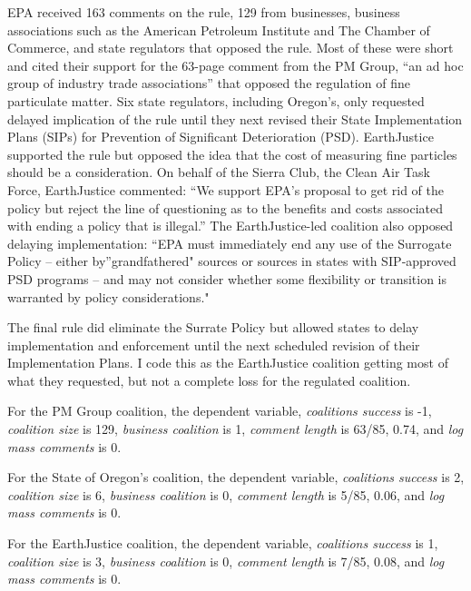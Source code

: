 \documentclass[
      12pt,
        ]{article}
\begin{document}
EPA received 163 comments on the rule, 129 from businesses, business associations such as the American Petroleum Institute and The Chamber of Commerce, and state regulators that opposed the rule. Most of these were short and cited their support for the 63-page comment from the PM Group, ``an ad hoc group of industry trade associations'' that opposed the regulation of fine particulate matter. Six state regulators, including Oregon's, only requested delayed implication of the rule until they next revised their State Implementation Plans (SIPs) for Prevention of Significant Deterioration (PSD). EarthJustice supported the rule but opposed the idea that the cost of measuring fine particles should be a consideration. On behalf of the Sierra Club, the Clean Air Task Force, EarthJustice commented: ``We support EPA's proposal to get rid of the policy but reject the line of questioning as to the benefits and costs associated with ending a policy that is illegal.'' The EarthJustice-led coalition also opposed delaying implementation: ``EPA must immediately end any use of the Surrogate Policy -- either by''grandfathered" sources or sources in states with SIP‐approved PSD programs -- and may not consider whether some flexibility or transition is warranted by policy considerations."

The final rule did eliminate the Surrate Policy but allowed states to delay implementation and enforcement until the next scheduled revision of their Implementation Plans. I code this as the EarthJustice coalition getting most of what they requested, but not a complete loss for the regulated coalition.

For the PM Group coalition, the dependent variable, \emph{coalitions success} is -1, \emph{coalition size} is 129, \emph{business coalition} is 1, \emph{comment length} is 63/85, 0.74, and \emph{log mass comments} is 0.

For the State of Oregon's coalition, the dependent variable, \emph{coalitions success} is 2, \emph{coalition size} is 6, \emph{business coalition} is 0, \emph{comment length} is 5/85, 0.06, and \emph{log mass comments} is 0.

For the EarthJustice coalition, the dependent variable, \emph{coalitions success} is 1, \emph{coalition size} is 3, \emph{business coalition} is 0, \emph{comment length} is 7/85, 0.08, and \emph{log mass comments} is 0.
\newpage
\singlespacing 
           
  
\end{document}
